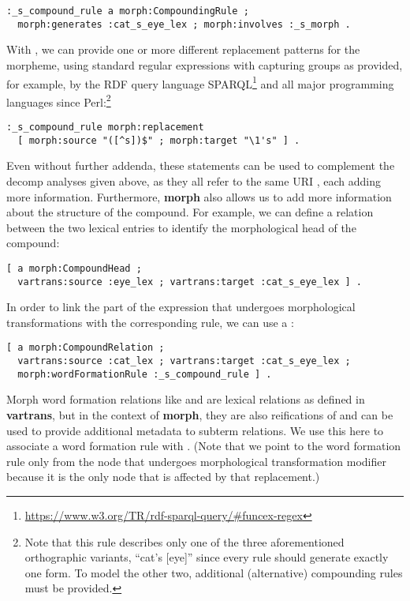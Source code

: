 \documentclass[output=paper,colorlinks,citecolor=brown]{langscibook}
\begin{document}
{\listingsize
\begin{verbatim}
:_s_compound_rule a morph:CompoundingRule ;
  morph:generates :cat_s_eye_lex ; morph:involves :_s_morph .
\end{verbatim}
}

\noindent
With , we can provide one or more different replacement patterns for the morpheme, using standard regular expressions with capturing groups as provided, for example, by the RDF query language SPARQL\footnote{%
    \url{https://www.w3.org/TR/rdf-sparql-query/\#funcex-regex}
} and all major programming languages since Perl:\footnote{Note that this rule describes only one of the three aforementioned orthographic variants, ``cat's [eye]'' since every rule should generate exactly one form. To model the other two, additional (alternative) compounding rules must be provided.}

{\listingsize
\begin{verbatim}
:_s_compound_rule morph:replacement
  [ morph:source "([^s])$" ; morph:target "\1's" ] .
\end{verbatim}
}

\noindent
Even without further addenda, these statements can be used to complement the decomp analyses given above, as they all refer to the same URI , each adding more information.
Furthermore, \textbf{morph} also allows us to add more information about the structure of the compound. For example, we can define a  relation between the two lexical entries to identify the morphological head of the compound:

{\listingsize
\begin{verbatim}
[ a morph:CompoundHead ;
  vartrans:source :eye_lex ; vartrans:target :cat_s_eye_lex ] .
\end{verbatim}
}

In order to link the part of the expression that undergoes morphological transformations with the corresponding rule, we can use a :

{\listingsize
\begin{verbatim}
[ a morph:CompoundRelation ;
  vartrans:source :cat_lex ; vartrans:target :cat_s_eye_lex ;
  morph:wordFormationRule :_s_compound_rule ] .
\end{verbatim}
}

\noindent
Morph word formation relations like  and  are lexical relations as defined in \textbf{vartrans}, but in the context of \textbf{morph}, they are also reifications of  and can be used to provide additional metadata to subterm relations.
We use this here to associate a word formation rule with . (Note that we point to the word formation rule only from the node that undergoes morphological transformation modifier because it is the only node that is affected by that replacement.)
\end{document}
